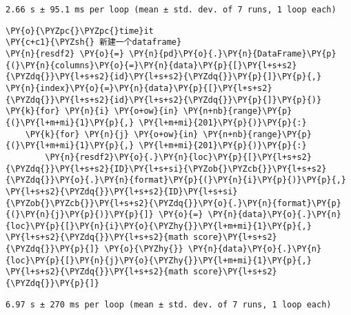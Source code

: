     \begin{Verbatim}[commandchars=\\\{\}]
2.66 s ± 95.1 ms per loop (mean ± std. dev. of 7 runs, 1 loop each)
    \end{Verbatim}

    \begin{tcolorbox}[breakable, size=fbox, boxrule=1pt, pad at break*=1mm,colback=cellbackground, colframe=cellborder]
\begin{Verbatim}[commandchars=\\\{\}]
\PY{o}{\PYZpc{}\PYZpc{}time}it
\PY{c+c1}{\PYZsh{} 新建一个dataframe}
\PY{n}{resdf2} \PY{o}{=} \PY{n}{pd}\PY{o}{.}\PY{n}{DataFrame}\PY{p}{(}\PY{n}{columns}\PY{o}{=}\PY{n}{data}\PY{p}{[}\PY{l+s+s2}{\PYZdq{}}\PY{l+s+s2}{id}\PY{l+s+s2}{\PYZdq{}}\PY{p}{]}\PY{p}{,} \PY{n}{index}\PY{o}{=}\PY{n}{data}\PY{p}{[}\PY{l+s+s2}{\PYZdq{}}\PY{l+s+s2}{id}\PY{l+s+s2}{\PYZdq{}}\PY{p}{]}\PY{p}{)}
\PY{k}{for} \PY{n}{i} \PY{o+ow}{in} \PY{n+nb}{range}\PY{p}{(}\PY{l+m+mi}{1}\PY{p}{,} \PY{l+m+mi}{201}\PY{p}{)}\PY{p}{:}
    \PY{k}{for} \PY{n}{j} \PY{o+ow}{in} \PY{n+nb}{range}\PY{p}{(}\PY{l+m+mi}{1}\PY{p}{,} \PY{l+m+mi}{201}\PY{p}{)}\PY{p}{:}
        \PY{n}{resdf2}\PY{o}{.}\PY{n}{loc}\PY{p}{[}\PY{l+s+s2}{\PYZdq{}}\PY{l+s+s2}{ID}\PY{l+s+si}{\PYZob{}\PYZcb{}}\PY{l+s+s2}{\PYZdq{}}\PY{o}{.}\PY{n}{format}\PY{p}{(}\PY{n}{i}\PY{p}{)}\PY{p}{,} \PY{l+s+s2}{\PYZdq{}}\PY{l+s+s2}{ID}\PY{l+s+si}{\PYZob{}\PYZcb{}}\PY{l+s+s2}{\PYZdq{}}\PY{o}{.}\PY{n}{format}\PY{p}{(}\PY{n}{j}\PY{p}{)}\PY{p}{]} \PY{o}{=} \PY{n}{data}\PY{o}{.}\PY{n}{loc}\PY{p}{[}\PY{n}{i}\PY{o}{\PYZhy{}}\PY{l+m+mi}{1}\PY{p}{,} \PY{l+s+s2}{\PYZdq{}}\PY{l+s+s2}{math score}\PY{l+s+s2}{\PYZdq{}}\PY{p}{]} \PY{o}{\PYZhy{}} \PY{n}{data}\PY{o}{.}\PY{n}{loc}\PY{p}{[}\PY{n}{j}\PY{o}{\PYZhy{}}\PY{l+m+mi}{1}\PY{p}{,} \PY{l+s+s2}{\PYZdq{}}\PY{l+s+s2}{math score}\PY{l+s+s2}{\PYZdq{}}\PY{p}{]}
\end{Verbatim}
\end{tcolorbox}

    \begin{Verbatim}[commandchars=\\\{\}]
6.97 s ± 270 ms per loop (mean ± std. dev. of 7 runs, 1 loop each)
    \end{Verbatim}
